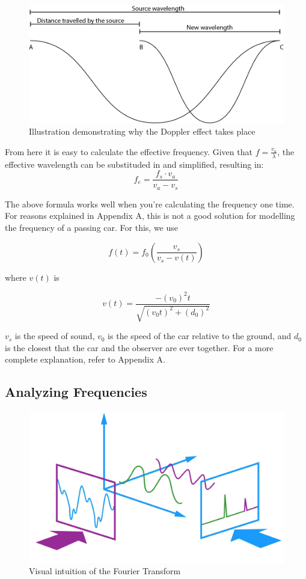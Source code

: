 \documentclass[12pt]{article}
\begin{document}
\begin{figure}[H]
	\centering
	\includegraphics[width=5in]{wavelength}
	\caption{Illustration demonstrating why the Doppler effect takes place}
	\label{fig:wavelength}
\end{figure}

From here it is easy to calculate the effective frequency. Given that $f = \frac{v_a}{ \lambda } $, the effective wavelength can be substituded in and simplified, resulting in:
$$ f_e = \frac{f_s \cdot v_a}{ v_a - v_s }$$

The above formula works well when you're calculating the frequency one time. For reasons explained in Appendix A, this is not a good solution for modelling the frequency of a passing car. For this, we use

$$f(t) = f_0 \left( \frac{v_s}{v_s - v(t)} \right) $$

where $v(t)$ is

$$ v(t) = \frac{- (v_0)^2 t}{\sqrt{(v_0 t) ^ 2 + (d_0) ^ 2}} $$

$v_s$ is the speed of sound, $v_0$ is the speed of the car relative to the ground, and $d_0$ is the closest that the car and the observer are ever together. For a more complete explanation, refer to Appendix A.


\subsection{Analyzing Frequencies}

\begin{figure}[H]
	\centering
	\includegraphics[width=5in]{composition}
	\caption{Visual intuition of the Fourier Transform}
	\label{fig:composition}
\end{figure}
\end{document}
